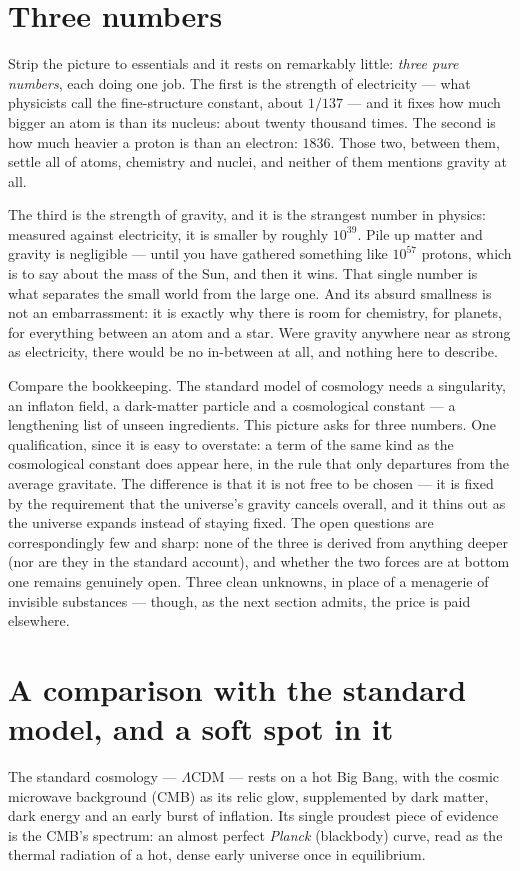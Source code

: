 \documentclass[11pt]{article}
\begin{document}
\section*{Three numbers}
Strip the picture to essentials and it rests on remarkably little: \emph{three pure numbers}, each doing one job.
The first is the strength of electricity --- what physicists call the fine-structure constant, about $1/137$ ---
and it fixes how much bigger an atom is than its nucleus: about twenty thousand times. The second is how much
heavier a proton is than an electron: $1836$. Those two, between them, settle all of atoms, chemistry and nuclei,
and neither of them mentions gravity at all.

The third is the strength of gravity, and it is the strangest number in physics: measured against electricity, it
is smaller by roughly $10^{39}$. Pile up matter and gravity is negligible --- until you have gathered something
like $10^{57}$ protons, which is to say about the mass of the Sun, and then it wins. That single number is what
separates the small world from the large one. And its absurd smallness is not an embarrassment: it is exactly why
there is room for chemistry, for planets, for everything between an atom and a star. Were gravity anywhere near as
strong as electricity, there would be no in-between at all, and nothing here to describe.

Compare the bookkeeping. The standard model of cosmology needs a singularity, an inflaton field, a dark-matter
particle and a cosmological constant --- a lengthening list of unseen ingredients. This picture asks for three
numbers. One qualification, since it is easy to overstate: a term of the same kind as the cosmological constant
does appear here, in the rule that only departures from the average gravitate. The difference is that it is not
free to be chosen --- it is fixed by the requirement that the universe's gravity cancels overall, and it thins out
as the universe expands instead of staying fixed. The open questions are correspondingly few and sharp: none of the three is derived from anything deeper
(nor are they in the standard account), and whether the two forces are at bottom one remains genuinely open. Three
clean unknowns, in place of a menagerie of invisible substances --- though, as the next section admits, the price
is paid elsewhere.

\section*{A comparison with the standard model, and a soft spot in it}
The standard cosmology --- $\Lambda$CDM --- rests on a hot Big Bang, with the cosmic microwave background (CMB) as
its relic glow, supplemented by dark matter, dark energy and an early burst of inflation. Its single proudest piece
of evidence is the CMB's spectrum: an almost perfect \emph{Planck} (blackbody) curve, read as the thermal radiation
of a hot, dense early universe once in equilibrium.
\end{document}
